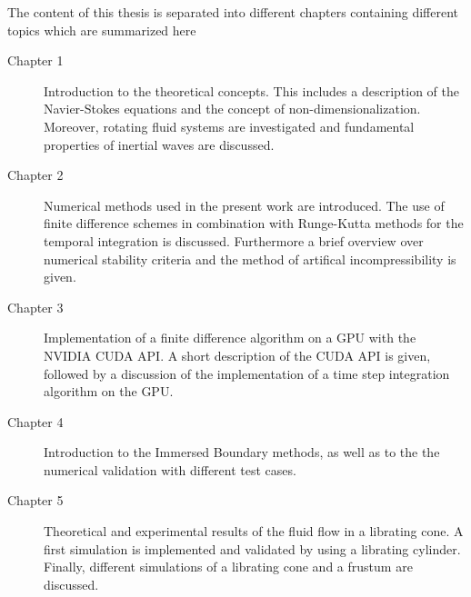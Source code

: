 The content of this thesis is separated into different chapters containing different topics which are summarized here

\begin{description}
\item[Chapter 1] Introduction to the theoretical concepts. This includes a description of the Navier-Stokes equations and
                 the concept of non-dimensionalization. Moreover, rotating fluid systems are investigated and
                 fundamental properties of inertial waves are discussed.

\item[Chapter 2] Numerical methods used in the present work are introduced.
                 The use of finite difference schemes in combination with Runge-Kutta methods for the temporal integration is discussed.
                 Furthermore a brief overview over numerical stability criteria and the method of artifical incompressibility is given.

\item[Chapter 3] Implementation of a finite difference algorithm on a GPU with the NVIDIA CUDA API.
                 A short description of the CUDA API is given, followed by a discussion of the implementation of
                 a time step integration algorithm on the GPU.

\item[Chapter 4] Introduction to the Immersed Boundary methods, as well as to the
                 the numerical validation with different test cases.

\item[Chapter 5] Theoretical and experimental results of the fluid flow in a librating cone.
                 A first simulation is implemented and validated by using a librating cylinder.
                 Finally, different  simulations of a librating cone and a frustum are discussed.
\end{description}

%












